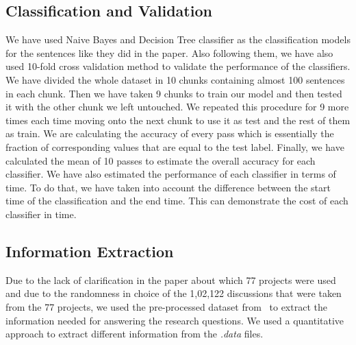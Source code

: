 \subsection{Classification and Validation}
We have used Naive Bayes and Decision Tree classifier as the classification models for the sentences like they did in the paper. Also following them, we have also used 10-fold cross validation method to validate the performance of the classifiers. We have divided the whole dataset in 10 chunks containing almost 100 sentences in each chunk. Then we have taken 9 chunks to train our model and then tested it with the other chunk we left untouched. We repeated this procedure for 9 more times each time moving onto the next chunk to use it as test and the rest of them as train. We are calculating the accuracy of every pass which is essentially the fraction of corresponding values that are equal to the test label. Finally, we have calculated the mean of 10 passes to estimate the overall accuracy for each classifier. We have also estimated the performance of each classifier in terms of time. To do that, we have taken into account the difference between the start time of the classification and the end time. This can demonstrate the cost of each classifier in time.

\subsection{Information Extraction}
Due to the lack of clarification in the paper about which 77 projects were used and due to the randomness in choice of the 1,02,122 discussions that were taken from the 77 projects, we used the pre-processed dataset from~\cite{Brunet2014a} to extract the information needed for answering the research questions. We used a quantitative approach to extract different information from the \emph{.data} files. 